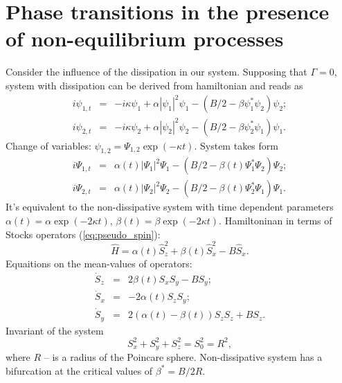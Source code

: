 \documentclass[aps, pre, preprint, groupedaddress, superscriptaddress, showkeys, showpacs] {revtex4-1}
\begin{document}
\section{Phase transitions in the presence of non-equilibrium processes 
\label{sec:non-equilibrium}}

Consider the influence of the dissipation in our system.
Supposing that $\Gamma = 0$, system with dissipation can be derived from hamiltonian and reads as
%
\begin{equation}
\begin{array}{lcl}
i \psi_{1, t} & = & -i \kappa \psi_1 +  \alpha |\psi_1|^2 \psi_1 - (B/2 - \beta \psi_1^* \psi_2) \psi_2; \\
i \psi_{2, t} & = & -i \kappa \psi_2 + \alpha |\psi_2|^2 \psi_2 - (B/2 - \beta \psi_2^* \psi_1) \psi_1.
\end{array}
\end{equation}
%
Change of variables: $\psi_{1,2} = \Psi_{1,2} \exp(-\kappa t)$.
System takes form
%
\begin{equation}
\begin{array}{lcl}
i \Psi_{1, t} & = & \alpha(t) |\Psi_1|^2 \Psi_1 - (B/2 - \beta(t) \Psi_1^* \Psi_2) \Psi_2; \\
i \Psi_{2, t} & = & \alpha(t) |\Psi_2|^2 \Psi_2 - (B/2 - \beta(t) \Psi_2^* \Psi_1) \Psi_1.
\end{array}
\end{equation}
%
It's equivalent to the non-dissipative system with time dependent parameters $\alpha(t) = \alpha \exp(-2 \kappa t)$, $\beta(t) = \beta \exp(-2 \kappa t)$.
Hamiltoninan in terms of Stocks operators (\ref{eq:pseudo_spin}):
%
\begin{equation}
\hat{H} = \alpha(t) \hat{S}_z^2 + \beta(t) \hat{S}_x^2 - B \hat{S}_x.
\end{equation}
%
Equaitions on the mean-values of operators:
% 
\begin{equation}
\begin{array}{lcl}
\dot{S}_z & = &  2 \beta(t) S_x S_y - B S_y; \\
\dot{S}_x & = & -2 \alpha(t) S_z S_y; \\
\dot{S}_y & = & 2(\alpha(t) - \beta(t)) S_z S_z + B S_z.
\end{array}
\end{equation}
%
Invariant of the system
%
\begin{equation}
S_x^2 + S_y^2 + S_z^2 = S_0^2 = R^2,
\end{equation}
%
where $R$ -- is a radius of the Poincare sphere.
Non-dissipative system has a bifurcation at the critical values of $\beta^* = B / 2R$.
\end{document}
